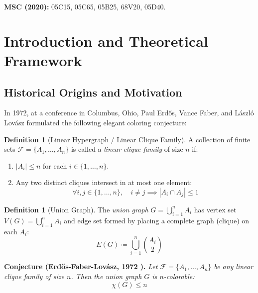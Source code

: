 \documentclass[11pt,a4paper]{article}
\theoremstyle{definition}
\newtheorem{definition}[theorem]{Definition}
\begin{document}
\noindent\textbf{MSC (2020):} 05C15, 05C65, 05B25, 68V20, 05D40.

\tableofcontents
\newpage

\section{Introduction and Theoretical Framework}

\subsection{Historical Origins and Motivation}
In 1972, at a conference in Columbus, Ohio, Paul Erd\H{o}s, Vance Faber, and L\'aszl\'o Lov\'asz \cite{erdos1975efl} formulated the following elegant coloring conjecture:

\begin{definition}[Linear Hypergraph / Linear Clique Family]\label{def:linear_hypergraph}
A collection of finite sets $\mathcal{F} = \{A_1, \dots, A_n\}$ is called a \emph{linear clique family} of size $n$ if:
\begin{enumerate}
    \item $|A_i| \le n$ for each $i \in \{1, \dots, n\}$.
    \item Any two distinct cliques intersect in at most one element:
    \begin{equation}\label{eq:linear_intersection}
    \forall i, j \in \{1, \dots, n\}, \quad i \ne j \implies |A_i \cap A_j| \le 1
    \end{equation}
\end{enumerate}
\end{definition}

\begin{definition}[Union Graph]\label{def:union_graph}
The \emph{union graph} $G = \bigcup_{i=1}^n A_i$ has vertex set $V(G) = \bigcup_{i=1}^n A_i$ and edge set formed by placing a complete graph (clique) on each $A_i$:
\begin{equation}\label{eq:edge_union}
E(G) \coloneqq \bigcup_{i=1}^n \binom{A_i}{2}
\end{equation}
\end{definition}

\noindent\textbf{Conjecture (Erd\H{o}s-Faber-Lov\'asz, 1972 \cite{erdos1975efl}).} \textit{Let $\mathcal{F} = \{A_1, \dots, A_n\}$ be any linear clique family of size $n$. Then the union graph $G$ is $n$-colorable:}
\begin{equation}\label{eq:efl_conj}
\chi(G) \le n
\end{equation}
\end{document}
